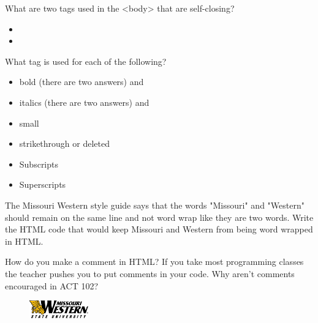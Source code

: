 \documentclass[letterpaper,12pt]{exam}
\begin{document}
\begin{questions}
\begin{samepage}
\question What are two tags used in the <body> that are self-closing? 
\begin{itemize}
\item
\vspace{5mm}
\item
\vspace{5mm}
\end{itemize}
\end{samepage}

\begin{samepage}
\question What tag is used for each of the following? 
\begin{itemize}
\item bold (there are two answers) \blank and \blank
\vspace{5mm}
\item italics (there are two answers) \blank and \blank
\vspace{5mm}
\item \blank small
\vspace{5mm}
\item \blank strikethrough or deleted
\vspace{5mm}
\item \blank Subscripts
\vspace {5mm}
\item \blank Superscripts
\vspace{5mm}
\end{itemize}
\end{samepage}

\begin{samepage}
\question The Missouri Western style guide says that the words "Missouri" and "Western" should remain on the same line and not word wrap like they are two words.  Write the HTML code that would keep Missouri and Western from being word wrapped in HTML. 
\vspace{15mm}
\end{samepage}

\begin{samepage}
\question How do you make a comment in HTML?  If you take most programming classes the teacher pushes you to put comments in your code. Why aren't comments encouraged in ACT 102? 
\vspace{15mm}
\end{samepage}

\end{questions}

\begin{figure}[b]\label{end}
	\center
	\includegraphics[width=1in]{tux}
\end{figure}
\end{document}
